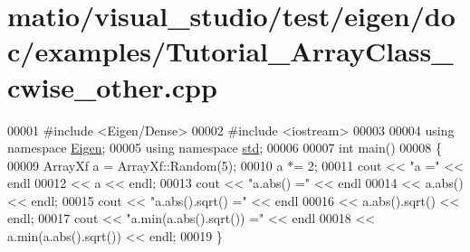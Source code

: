 \hypertarget{matio_2visual__studio_2test_2eigen_2doc_2examples_2_tutorial___array_class__cwise__other_8cpp_source}{}\section{matio/visual\+\_\+studio/test/eigen/doc/examples/\+Tutorial\+\_\+\+Array\+Class\+\_\+cwise\+\_\+other.cpp}
\label{matio_2visual__studio_2test_2eigen_2doc_2examples_2_tutorial___array_class__cwise__other_8cpp_source}

\begin{DoxyCode}
00001 \textcolor{preprocessor}{#include <Eigen/Dense>}
00002 \textcolor{preprocessor}{#include <iostream>}
00003 
00004 \textcolor{keyword}{using namespace }\hyperlink{namespace_eigen}{Eigen};
00005 \textcolor{keyword}{using namespace }\hyperlink{namespacestd}{std};
00006 
00007 \textcolor{keywordtype}{int} main()
00008 \{
00009   ArrayXf a = ArrayXf::Random(5);
00010   a *= 2;
00011   cout << \textcolor{stringliteral}{"a ="} << endl 
00012        << a << endl;
00013   cout << \textcolor{stringliteral}{"a.abs() ="} << endl 
00014        << a.abs() << endl;
00015   cout << \textcolor{stringliteral}{"a.abs().sqrt() ="} << endl 
00016        << a.abs().sqrt() << endl;
00017   cout << \textcolor{stringliteral}{"a.min(a.abs().sqrt()) ="} << endl 
00018        << a.min(a.abs().sqrt()) << endl;
00019 \}
\end{DoxyCode}
